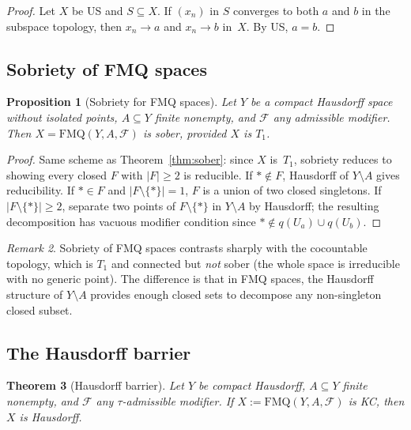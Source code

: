 \documentclass[11pt]{article}
\newtheorem{theorem}{Theorem}[section]
\newtheorem{proposition}[theorem]{Proposition}
\theoremstyle{definition}
\theoremstyle{remark}
\newtheorem{remark}[theorem]{Remark}
\begin{document}
\begin{proof}
Let $X$ be US and $S \subseteq X$. If $(x_n)$ in $S$ converges to both $a$
and $b$ in the subspace topology, then $x_n \to a$ and $x_n \to b$ in~$X$. By US, $a = b$.
\end{proof}

\subsection{Sobriety of FMQ spaces}

\begin{proposition}[Sobriety for FMQ spaces]\label{prop:soberFMQ}
Let $Y$ be a compact Hausdorff space without isolated points,
$A \subseteq Y$ finite nonempty, and $\mathcal{F}$ any admissible
modifier.
Then $X = \mathrm{FMQ}(Y, A, \mathcal{F})$ is sober, provided $X$
is $T_1$.
\end{proposition}

\begin{proof}
Same scheme as Theorem~\ref{thm:sober}: since $X$ is~$T_1$, sobriety
reduces to showing every closed $F$ with $|F| \geq 2$ is reducible.
If $\ast \notin F$, Hausdorff of $Y \setminus A$ gives reducibility.
If $\ast \in F$ and $|F \setminus \{\ast\}| = 1$,
$F$ is a union of two closed singletons.
If $|F \setminus \{\ast\}| \geq 2$, separate two points of
$F \setminus \{\ast\}$ in $Y \setminus A$ by Hausdorff; the
resulting decomposition has vacuous modifier condition since
$\ast \notin q(U_a) \cup q(U_b)$.
\end{proof}

\begin{remark}\label{rmk:sobriety-general}
Sobriety of FMQ spaces contrasts sharply with the cocountable
topology, which is $T_1$ and connected but \emph{not} sober (the
whole space is irreducible with no generic point).
The difference is that in FMQ spaces, the Hausdorff structure of
$Y \setminus A$ provides enough closed sets to decompose any
non-singleton closed subset.
\end{remark}

\subsection{The Hausdorff barrier}

\begin{theorem}[Hausdorff barrier]\label{thm:barrier}
Let $Y$ be compact Hausdorff, $A \subseteq Y$ finite nonempty, and
$\mathcal{F}$ any $\tau$-admissible modifier.
If\/ $X := \mathrm{FMQ}(Y, A, \mathcal{F})$ is KC, then $X$ is Hausdorff.
\end{theorem}
\end{document}
